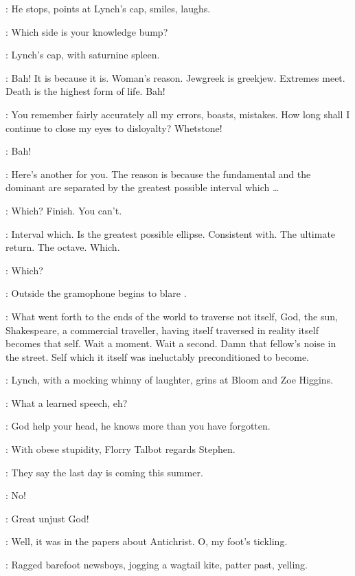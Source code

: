 :
He stops, points at Lynch's cap, smiles, laughs.

\Stephen:
Which side is your knowledge bump?

:
Lynch's cap, with saturnine spleen.

\Cap:
Bah!
It is because it is.
Woman's reason.
Jewgreek is greekjew.
Extremes meet.
Death is the highest form of life.
Bah!

\Stephen:
You remember fairly accurately all my errors, boasts, mistakes.
How long shall I continue to close my eyes to disloyalty?
Whetstone!

\Cap[1]:
Bah!

\Stephen:
Here's another for you.
The reason is because the fundamental and the dominant
are separated by the greatest possible interval which \ldots

\Cap:
Which?
Finish.
You can't.

\Stephen:
Interval which.
Is the greatest possible ellipse.
Consistent with.
The ultimate return.
The octave.
Which.

\Cap:
Which?

:
Outside the gramophone begins to blare .

\Stephen:
What went forth to the ends of the world to traverse not itself,
God, the sun, Shakespeare, a commercial traveller,
having itself traversed in reality itself becomes that self.
Wait a moment.
Wait a second.
Damn that fellow's noise in the street.
Self which it itself was ineluctably preconditioned to become.

:
Lynch, with a mocking whinny of laughter, grins at Bloom and Zoe Higgins.

\Lynch:
What a learned speech, eh?

\Zoe:
God help your head, he knows more than you have forgotten.

:
With obese stupidity, Florry Talbot regards Stephen.

\Florry:
They say the last day is coming this summer.

\Kitty:
No!

\Zoe:
Great unjust God!

\Florry:
Well, it was in the papers about Antichrist.
O, my foot's tickling.

:
Ragged barefoot newsboys, jogging a wagtail kite, patter past, yelling.

